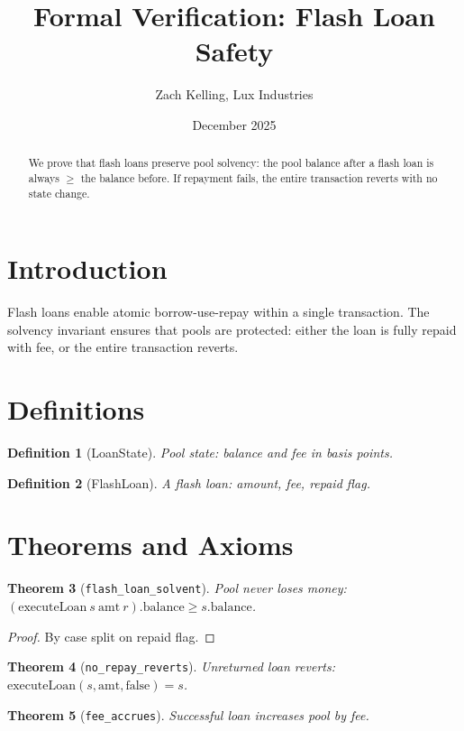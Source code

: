 \documentclass[11pt]{article}
\title{Formal Verification: Flash Loan Safety}
\author{Zach Kelling, Lux Industries}
\date{December 2025}
\newtheorem{theorem}{Theorem}
\newtheorem{definition}[theorem]{Definition}
\begin{document}
\maketitle

\begin{abstract}
We prove that flash loans preserve pool solvency: the pool balance after a flash loan is always $\geq$ the balance before. If repayment fails, the entire transaction reverts with no state change.
\end{abstract}

\section{Introduction}
Flash loans enable atomic borrow-use-repay within a single transaction. The solvency invariant ensures that pools are protected: either the loan is fully repaid with fee, or the entire transaction reverts.

\section{Definitions}
\begin{definition}[LoanState]
Pool state: balance and fee in basis points.
\end{definition}

\begin{definition}[FlashLoan]
A flash loan: amount, fee, repaid flag.
\end{definition}


\section{Theorems and Axioms}
\begin{theorem}[\texttt{flash\_loan\_solvent}]
Pool never loses money: $(\text{executeLoan}~s~\text{amt}~r).\text{balance} \geq s.\text{balance}$.
\end{theorem}
\begin{proof}
By case split on repaid flag.
\end{proof}

\begin{theorem}[\texttt{no\_repay\_reverts}]
Unreturned loan reverts: $\text{executeLoan}(s, \text{amt}, \text{false}) = s$.
\end{theorem}

\begin{theorem}[\texttt{fee\_accrues}]
Successful loan increases pool by fee.
\end{theorem}
\end{document}
